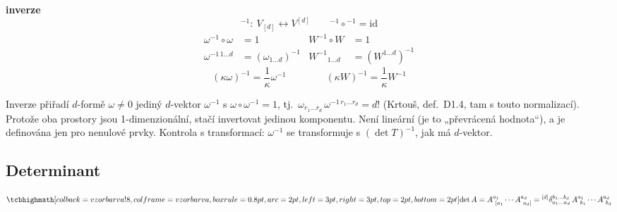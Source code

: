 \textbf{inverze}
\[
  {}^{-1}:\ V_{[d]}\longleftrightarrow V^{[d]} \qquad {}^{-1}\circ{}^{-1} = \mathrm{id}
\]
\begin{align*}
  \omega^{-1}\circ\omega &= 1 & W^{-1}\circ W &= 1 \\
  \omega^{-1\,1\dots d} &= (\omega_{1\dots d})^{-1} & W^{-1}{}_{1\dots d} &= (W^{1\dots d})^{-1}
\end{align*}
\[
  (\kappa\omega)^{-1} = \frac{1}{\kappa}\omega^{-1} \qquad\qquad (\kappa W)^{-1} = \frac{1}{\kappa}W^{-1}
\]

\begin{vysvetleni}[inverze]
Inverze přiřadí $d$-formě $\omega\neq0$ jediný $d$-vektor $\omega^{-1}$ s $\omega\circ\omega^{-1}=1$, tj.\ $\omega_{r_1\dots r_d}\,\omega^{-1\,r_1\dots r_d}=d!$ (Krtouš, def.~D1.4, tam s touto normalizací). Protože oba prostory jsou 1-dimenzionální, stačí invertovat jedinou komponentu. Není lineární (je to „převrácená hodnota“), a je definována jen pro nenulové prvky. Kontrola s transformací: $\omega^{-1}$ se transformuje s $(\det T)^{-1}$, jak má $d$-vektor.
\end{vysvetleni}

\subsection{Determinant}

\begin{definice}
\[
  \vzorec{\det A = A^{a_1}_{\ [a_1}\cdots A^{a_d}_{\ a_d]} = {}^{[d]}\delta^{b_1\dots b_d}_{a_1\dots a_d}\,A^{a_1}_{\ b_1}\cdots A^{a_d}_{\ b_d}}
\]
\end{definice}

